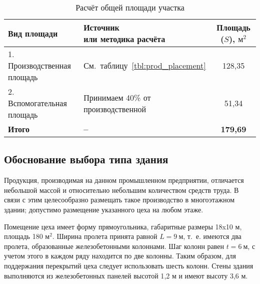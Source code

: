 \begin{table} [h!]
  \caption{
    Расчёт общей площади участка
  }\label{tbl:common_placement}
    \begin{tabular}{| m{5.8cm} | m{5.75cm} | c |}
      \hline
      \parbox{5.8cm}{
        \smallskip
        \centering Вид  площади
        \smallskip
      }
      & \parbox{5.75cm}{
          \smallskip
          \centering Источник \\ или методика расчёта
          \smallskip
      }
      & Площадь (\( S \)), \( \text{м}^2 \) \\
      \hline

      1. Производственная \newline площадь 
      & \centering См.~таблицу~\ref{tbl:prod_placement}
      & 128{,}35 \\
      \hline

      2. Вспомогательная \newline площадь 
      & \centering Принимаем 40\% \newline от производственной
      & 51{,}34 \\
      \hline
      
      \raggedleft \textbf{Итого} & \centering \textbf{--} & \textbf{179{,}69} \\
      \hline
    \end{tabular}
\end{table}

\subsection{Обоснование выбора типа здания}

Продукция, производимая на данном промышленном предприятии,
отличается небольшой массой и относительно небольшим количеством средств труда.
В связи с этим целесообразно размещать такое производство в многоэтажном здании;
допустимо размещение указанного цеха на любом этаже.

Помещение цеха имеет форму прямоугольника, габаритные размеры 18x10 м, 
площадь 180 \( \text{м}^2 \).
Ширина пролета принята равной \( L = 9 \: \text{м} \),
т.~е. имеются два пролета, образованные железобетонными колоннами. 
Шаг колонн равен \( t = 6 \: \text{м} \), с учетом этого в каждом ряду находится
по две колонны.
Таким образом, для поддержания перекрытий цеха следует использовать шесть колонн.
Стены здания выполняются из железобетонных панелей высотой 1{,}2 м и
имеют высоту 3{,}6 м.
